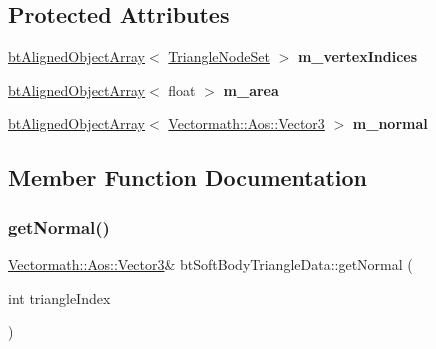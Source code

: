 \subsection*{Protected Attributes}
\begin{DoxyCompactItemize}
\item 
\mbox{\label{classbtSoftBodyTriangleData_a57d01a84ab5f7d3b4bafb674dec2dd60}} 
\hyperlink{classbtAlignedObjectArray}{bt\+Aligned\+Object\+Array}$<$ \hyperlink{classbtSoftBodyTriangleData_1_1TriangleNodeSet}{Triangle\+Node\+Set} $>$ {\bfseries m\+\_\+vertex\+Indices}
\item 
\mbox{\label{classbtSoftBodyTriangleData_abeaa6783f7b46fe9acf02913a89e024f}} 
\hyperlink{classbtAlignedObjectArray}{bt\+Aligned\+Object\+Array}$<$ float $>$ {\bfseries m\+\_\+area}
\item 
\mbox{\label{classbtSoftBodyTriangleData_ab902e3586ddebe5f7b241d5c36df0e41}} 
\hyperlink{classbtAlignedObjectArray}{bt\+Aligned\+Object\+Array}$<$ \hyperlink{classVectormath_1_1Aos_1_1Vector3}{Vectormath\+::\+Aos\+::\+Vector3} $>$ {\bfseries m\+\_\+normal}
\end{DoxyCompactItemize}


\subsection{Member Function Documentation}
\mbox{\label{classbtSoftBodyTriangleData_a4b93ad32b7b619bf99f952f7b662469d}} 
\subsubsection{\texorpdfstring{get\+Normal()}{getNormal()}\hspace{0.1cm}{\footnotesize\ttfamily [1/2]}}
{\footnotesize\ttfamily \hyperlink{classVectormath_1_1Aos_1_1Vector3}{Vectormath\+::\+Aos\+::\+Vector3}\& bt\+Soft\+Body\+Triangle\+Data\+::get\+Normal (\begin{DoxyParamCaption}\item[{int}]{triangle\+Index }\end{DoxyParamCaption})\hspace{0.3cm}{\ttfamily [inline]}}

